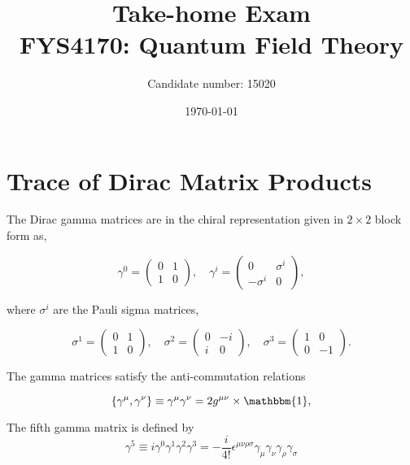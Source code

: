 \documentclass[11pt, a4paper]{amsart}
\title[FYS4170: Take-home Exam]{Take-home Exam \\
   \hrulefill \small{ FYS4170: Quantum Field Theory }\hrulefill}
\author[15020]{Candidate number: 15020}
\date{\today}
\begin{document}
 
\maketitle

\section{Trace of Dirac Matrix Products}

The Dirac gamma matrices are in the chiral representation given in $2\times 2$ block form as,

\begin{equation}
\gamma^0 = \begin{pmatrix}
0 & 1 \\ 1 & 0
\end{pmatrix}, \quad
\gamma^i = \begin{pmatrix}
0 & \sigma^i \\ -\sigma^i & 0
\end{pmatrix},
\end{equation}

where $\sigma^i$ are the Pauli sigma matrices,

\begin{equation}
\sigma^1 = \begin{pmatrix}
0 &  1 \\ 1 & 0
\end{pmatrix},
\quad
\sigma^2 = \begin{pmatrix}
0 & -i \\ i & 0
\end{pmatrix},
\quad
\sigma^3 = \begin{pmatrix}
1 & 0 \\ 0 & -1
\end{pmatrix}.
\end{equation}

The gamma matrices satisfy the anti-commutation relations

\begin{equation}
\label{eq:gamma_anti_comm}
\{\gamma^\mu, \gamma^\nu\} \equiv \gamma^\mu \gamma^\nu = 2g^{\mu\nu} \times \mathbbm{1},
\end{equation}

The fifth gamma matrix is defined by
\begin{equation}
\gamma^5 \equiv i \gamma^0 \gamma^1 \gamma^2 \gamma^3 
= -\frac{i}{4!}\epsilon^{\mu\nu\rho\sigma}\gamma_\mu\gamma_\nu\gamma_\rho\gamma_\sigma
\end{equation}
\end{document}
